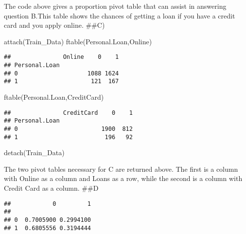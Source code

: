 \documentclass[
]{article}
\newenvironment{Shaded}{\begin{snugshade}}{\end{snugshade}}
\newcommand{\AttributeTok}[1]{\textcolor[rgb]{0.77,0.63,0.00}{#1}}
\newcommand{\DecValTok}[1]{\textcolor[rgb]{0.00,0.00,0.81}{#1}}
\newcommand{\FunctionTok}[1]{\textcolor[rgb]{0.00,0.00,0.00}{#1}}
\newcommand{\NormalTok}[1]{#1}
\newcommand{\SpecialCharTok}[1]{\textcolor[rgb]{0.00,0.00,0.00}{#1}}
\begin{document}
The code above gives a proportion pivot table that can assist in
answering question B.This table shows the chances of getting a loan if
you have a credit card and you apply online. \#\#C)

\begin{Shaded}
\begin{Highlighting}[]
\FunctionTok{attach}\NormalTok{(Train\_Data)}
\FunctionTok{ftable}\NormalTok{(Personal.Loan,Online)}
\end{Highlighting}
\end{Shaded}

\begin{verbatim}
##               Online    0    1
## Personal.Loan                 
## 0                    1088 1624
## 1                     121  167
\end{verbatim}

\begin{Shaded}
\begin{Highlighting}[]
\FunctionTok{ftable}\NormalTok{(Personal.Loan,CreditCard)}
\end{Highlighting}
\end{Shaded}

\begin{verbatim}
##               CreditCard    0    1
## Personal.Loan                     
## 0                        1900  812
## 1                         196   92
\end{verbatim}

\begin{Shaded}
\begin{Highlighting}[]
\FunctionTok{detach}\NormalTok{(Train\_Data)}
\end{Highlighting}
\end{Shaded}

The two pivot tables necessary for C are returned above. The first is a
column with Online as a column and Loans as a row, while the second is a
column with Credit Card as a column. \#\#D

\begin{Shaded}
\end{Shaded}

\begin{verbatim}
##            0         1
##                       
## 0  0.7005900 0.2994100
## 1  0.6805556 0.3194444
\end{verbatim}
\end{document}
